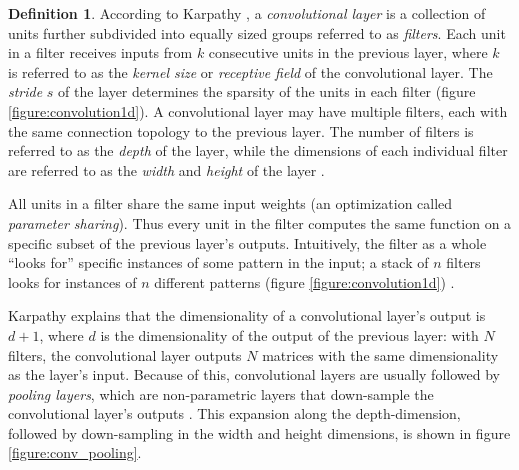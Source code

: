 \documentclass[12pt, titlepage]{report}
\theoremstyle{definition}
\newtheorem{definition}{Definition}
\begin{document}
\begin{definition}
According to Karpathy \cite{karpathy2017cs231n}, a \emph{convolutional layer} is a collection of units further subdivided into equally sized groups referred to as \emph{filters}. Each unit in a filter receives inputs from $k$ consecutive units in the previous layer, where $k$ is referred to as the \emph{kernel size} or \emph{receptive field} of the convolutional layer. The \emph{stride} $s$ of the layer determines the sparsity of the units in each filter (figure \ref{figure:convolution1d}). A convolutional layer may have multiple filters, each with the same connection topology to the previous layer. The number of filters is referred to as the \emph{depth} of the layer, while the dimensions of each individual filter are referred to as the \emph{width} and \emph{height} of the layer \cite[Convolutional Neural Networks: Architectures, Convolution / Pooling Layers]{karpathy2017cs231n}.
\end{definition}

All units in a filter share the same input weights (an optimization called \emph{parameter sharing}). Thus every unit in the filter computes the same function on a specific subset of the previous layer's outputs. Intuitively, the filter as a whole ``looks for'' specific instances of some pattern in the input; a stack of $n$ filters looks for instances of $n$ different patterns (figure \ref{figure:convolution1d}) \cite[Convolutional Neural Networks: Architectures, Convolution / Pooling Layers]{karpathy2017cs231n}.

Karpathy explains that the dimensionality of a convolutional layer's output is $d + 1$, where $d$ is the dimensionality of the output of the previous layer: with $N$ filters, the convolutional layer outputs $N$ matrices with the same dimensionality as the layer's input. Because of this, convolutional layers are usually followed by \emph{pooling layers}, which are non-parametric layers that down-sample the convolutional layer's outputs \cite[Convolutional Neural Networks: Architectures, Convolution / Pooling Layers]{karpathy2017cs231n}. This expansion along the depth-dimension, followed by down-sampling in the width and height dimensions, is shown in figure \ref{figure:conv_pooling}.
\end{document}
